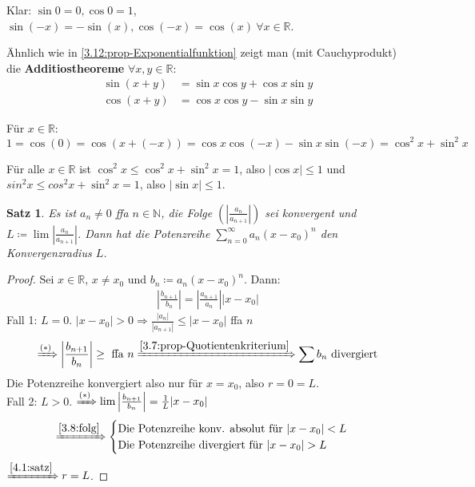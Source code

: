 \documentclass{extreport}
\newcommand{\N}{\mathbb{N}}
\newcommand{\R}{\mathbb{R}}
\theoremstyle{named}
\theoremstyle{dotless}
\newtheorem{satz}[namedtheorem]{Satz}
\begin{document}
Klar: $\sin 0 = 0, \cos 0 = 1$, $\sin (-x) = - \sin(x), \cos(-x) = \cos(x) ~\forall x \in \R$.

Ähnlich wie in \ref{3.12:prop-Exponentialfunktion} zeigt man (mit Cauchyprodukt) die \textbf{Additiostheoreme} $\forall x,y \in \R$:
\begin{align*}
	\sin(x+y) & = \sin x \cos y + \cos x \sin y \\
	\cos(x+y) & = \cos x \cos y - \sin x \sin y
\end{align*}

Für $x \in \R$:
	$$ 1 = \cos(0) = \cos( x + (-x) )= \cos x \cos(-x) - \sin x \sin(-x) = \cos^{2} x + \sin^{2} x $$

Für alle $x \in \R$ ist $\cos^{2} x \leq \cos^{2} x + \sin^{2} x = 1$, also $|\cos x | \leq 1$ und $sin^{2} x \leq cos^{2} x + \sin^{2} x = 1$, also $|\sin x | \leq 1$.


\begin{satz} \label{4.4:satz}
	Es ist $a_{n} \neq 0$ ffa $n \in \N$, die Folge $\left( \left| \frac{a_{n}}{a_{n+1}} \right| \right)$ sei konvergent und $L \coloneqq \lim \left| \frac{a_{n}}{a_{n+1}} \right|$. Dann hat die Potenzreihe $\sum_{n=0}^{\infty} a_{n} (x - x_{0})^{n}$ den Konvergenzradius $L$.
\end{satz}

\begin{proof}
	Sei $x \in \R$, $x \neq x_{0}$ und $b_{n} \coloneqq a_{n} (x - x_{0})^{n}$. Dann:
	\begin{align}
		 \left| \frac{b_{n+1}}{b_{n}} \right| = \left| \frac{a_{n+1}}{a_{n}} \right| |x - x_{0}| \tag{$*$}
	\end{align}
	Fall 1: $L = 0$. $|x - x_{0}| > 0 \Rightarrow \frac{|a_{n}|}{|a_{n+1}|} \leq | x - x_{0}|$ ffa $n$
	$$ \xRightarrow[]{(*)} \left| \frac{b_{n+1}}{b_{n}} \right| \geq \text{ ffa } n \xRightarrow[]{\ref{3.7:prop-Quotientenkriterium}} \sum b_{n} \text{ divergiert} $$
	Die Potenzreihe konvergiert also nur für $x = x_{0}$, also $r = 0 = L$. \\
	Fall 2: $L > 0$. $\xRightarrow[]{(*)} \lim \left| \frac{b_{n+1}}{b_{n}} \right| = \frac{1}{L} |x - x_{0}|$
	$$ \xRightarrow[]{\ref{3.8:folg}} \begin{cases}
		\text{Die Potenzreihe konv. absolut für } |x - x_{0}| < L \\
		\text{Die Potenzreihe divergiert für } |x - x_{0}| > L
	\end{cases} $$
	$\xRightarrow[]{\ref{4.1:satz}} r = L$.
\end{proof}
\end{document}

